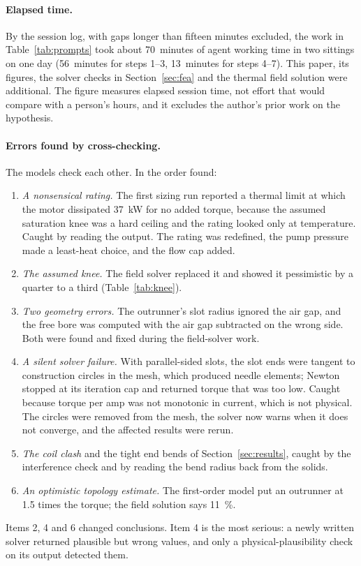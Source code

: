 \documentclass[11pt]{article}
\begin{document}
\paragraph{Elapsed time.} By the session log, with gaps longer than
fifteen minutes excluded, the work in Table~\ref{tab:prompts} took about
\SI{70}{minutes} of agent working time in two sittings on one day
(\SI{56}{minutes} for steps 1--3, \SI{13}{minutes} for steps 4--7). This
paper, its figures, the solver checks in Section~\ref{sec:fea} and the thermal
field solution were additional. The figure measures elapsed session time, not effort that would
compare with a person's hours, and it excludes the author's prior work on
the hypothesis.

\paragraph{Errors found by cross-checking.} The models check each other. In
the order found:
\begin{enumerate}
\item \emph{A nonsensical rating.} The first sizing run reported a thermal
  limit at which the motor dissipated \SI{37}{kW} for no added torque, because
  the assumed saturation knee was a hard ceiling and the rating looked only at
  temperature. Caught by reading the output. The rating was redefined, the
  pump pressure made a least-heat choice, and the flow cap added.
\item \emph{The assumed knee.} The field solver replaced it and showed it
  pessimistic by a quarter to a third (Table~\ref{tab:knee}).
\item \emph{Two geometry errors.} The outrunner's slot radius ignored the air
  gap, and the free bore was computed with the air gap subtracted on the wrong
  side. Both were found and fixed during the field-solver work.
\item \emph{A silent solver failure.} With parallel-sided slots, the slot ends
  were tangent to construction circles in the mesh, which produced needle
  elements; Newton stopped at its iteration cap and returned torque that was
  too low. Caught because torque per amp was not monotonic in current, which
  is not physical. The circles were removed from the mesh, the solver now
  warns when it does not converge, and the affected results were rerun.
\item \emph{The coil clash} and the tight end bends of
  Section~\ref{sec:results}, caught by the interference check and by reading
  the bend radius back from the solids.
\item \emph{An optimistic topology estimate.} The first-order model put an
  outrunner at 1.5 times the torque; the field solution says \SI{11}{\percent}.
\end{enumerate}
Items 2, 4 and 6 changed conclusions. Item 4 is the most serious: a newly
written solver returned plausible but wrong values, and only a
physical-plausibility check on its output detected them.
\end{document}
